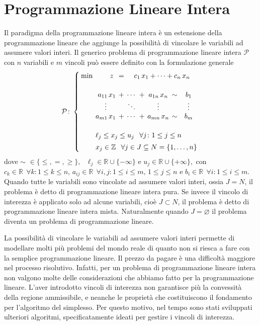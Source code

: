 \section{Programmazione Lineare Intera}
Il paradigma della programmazione lineare intera è un estensione della programmazione lineare che aggiunge la
possibilità di vincolare le variabili ad assumere valori interi. Il generico problema di programmazione lineare intera
\( \mathcal{P} \) con \( n \) variabili e \( m \) vincoli può essere definito con la formulazione generale
\begin{equation}
\mathcal{P}\colon
\setlength{\arraycolsep}{2pt}
\left\{\begin{array}{rrcccccc}
\min & z\,\, &=& \multicolumn{5}{c}{c_{1}\,x_{1}+\cdots+c_{n}\,x_{n}} \\[15pt]
     &  a_{11}\,x_{1} &+ &\cdots &+ &a_{1n}\,x_{n} &\sim &b_{1}       \\
     & \multicolumn{1}{c}{\vdots} &&\ddots&&\vdots&& \vdots           \\
     &  a_{m1}\,x_{1} &+ &\cdots &+ &a_{mn}\,x_{n} &\sim &b_{m}       \\[15pt]
     & \multicolumn{7}{l}{\ell_j \le x_{j} \le u_{j} \;\;\, \forall j\colon 1 \le j \le n} \\[5pt]
     & \multicolumn{7}{l}{x_j \in \mathbb{Z} \;\;\, \forall j \in J \subseteq N = \{ 1, \ldots, n \}}
\end{array}\right.\\[10pt]
\end{equation}
dove
\(
\sim \,\,\in \{ \leq, =, \geq \}, \text{ } \ell_j \in \mathbb{R} \cup \{-\infty\} \text{ e } u_j \in \mathbb{R} \cup
\{+\infty\},
\)
con \( c_k \in \mathbb{R} \;\, \forall k\colon 1 \leq k \leq n \), \( a_{ij} \in \mathbb{R} \;\, \forall i,j\colon 1
\leq i \leq m,\, 1 \leq j \leq n \) e \( b_i \in \mathbb{R}\;\, \forall i\colon 1 \leq i \leq m \).
Quando tutte le variabili sono vincolate ad assumere valori interi, ossia \( J = N \), il problema è detto di
programmazione lineare intera pura. Se invece il vincolo di interezza è applicato solo ad alcune variabili, cioè \( J
\subset N \), il problema è detto di programmazione lineare intera mista. Naturalmente quando \( J = \varnothing \) il
problema diventa un problema di programmazione lineare.

La possibilità di vincolare le variabili ad assumere valori interi permette di modellare molti più problemi del mondo
reale di quanto non si riesca a fare con la semplice programmazione lineare. Il prezzo da pagare è una difficoltà
maggiore nel processo risolutivo. Infatti, per un problema di programmazione lineare intera non valgono molte delle
considerazioni che abbiamo fatto per la programmazione lineare. L'aver introdotto vincoli di interezza non
garantisce più la convessità della regione ammissibile, e neanche le proprietà che costituiscono il fondamento per
l'algoritmo del simplesso. Per questo motivo, nel tempo sono stati sviluppati ulteriori algoritmi, specificatamente
ideati per gestire i vincoli di interezza.


